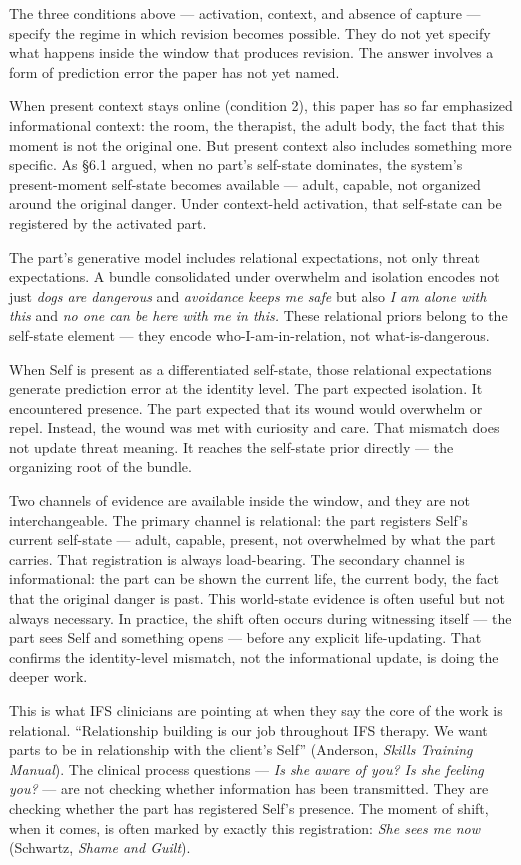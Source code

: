 \documentclass[12pt,a4paper]{article}
\begin{document}
The three conditions above --- activation, context, and absence of
capture --- specify the regime in which revision becomes possible. They
do not yet specify what happens inside the window that produces
revision. The answer involves a form of prediction error the paper has
not yet named.

When present context stays online (condition 2), this paper has so far
emphasized informational context: the room, the therapist, the adult
body, the fact that this moment is not the original one. But present
context also includes something more specific. As §6.1 argued, when no
part's self-state dominates, the system's present-moment self-state
becomes available --- adult, capable, not organized around the original
danger. Under context-held activation, that self-state can be registered
by the activated part.

The part's generative model includes relational expectations, not only
threat expectations. A bundle consolidated under overwhelm and isolation
encodes not just \emph{dogs are dangerous} and \emph{avoidance keeps me
safe} but also \emph{I am alone with this} and \emph{no one can be here
with me in this.} These relational priors belong to the self-state
element --- they encode who-I-am-in-relation, not what-is-dangerous.

When Self is present as a differentiated self-state, those relational
expectations generate prediction error at the identity level. The part
expected isolation. It encountered presence. The part expected that its
wound would overwhelm or repel. Instead, the wound was met with
curiosity and care. That mismatch does not update threat meaning. It
reaches the self-state prior directly --- the organizing root of the
bundle.

Two channels of evidence are available inside the window, and they are
not interchangeable. The primary channel is relational: the part
registers Self's current self-state --- adult, capable, present, not
overwhelmed by what the part carries. That registration is always
load-bearing. The secondary channel is informational: the part can be
shown the current life, the current body, the fact that the original
danger is past. This world-state evidence is often useful but not always
necessary. In practice, the shift often occurs during witnessing itself
--- the part sees Self and something opens --- before any explicit
life-updating. That confirms the identity-level mismatch, not the
informational update, is doing the deeper work.

This is what IFS clinicians are pointing at when they say the core of
the work is relational. ``Relationship building is our job throughout
IFS therapy. We want parts to be in relationship with the client's
Self'' (Anderson, \emph{Skills Training Manual}). The clinical process
questions --- \emph{Is she aware of you? Is she feeling you?} --- are
not checking whether information has been transmitted. They are checking
whether the part has registered Self's presence. The moment of shift,
when it comes, is often marked by exactly this registration: \emph{She
sees me now} (Schwartz, \emph{Shame and Guilt}).
\end{document}
